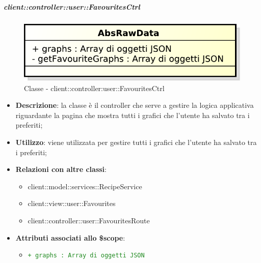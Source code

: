 		\subparagraph{client::controller::user::FavouritesCtrl} %
		\label{subp:client_controller_user_favouritesctrl}
			\begin{figure}[htbp]
				\centering
				\centerline{\includegraphics[scale=0.7]{./images/client/classes/controller/favourites_ctrl.pdf}}
				\caption{Classe - client::controller:user::FavouritesCtrl}
			\end{figure}
			\begin{itemize}
				\item \textbf{Descrizione}: la classe è il controller che serve a gestire la logica applicativa riguardante la pagina che mostra tutti i grafici che l'utente ha salvato tra i preferiti;
				\item \textbf{Utilizzo}: viene utilizzata per gestire tutti i grafici che l'utente ha salvato tra i preferiti;
				\item \textbf{Relazioni con altre classi}:
					\begin{itemize}
						\item client::model::services::RecipeService
						\item client::view::user::Favourites
						\item client::controller::user::FavouritesRoute
					\end{itemize}

				\item \textbf{Attributi associati allo \$scope}:
					\begin{itemize}
						\item \textcolor{forestgreen}{\texttt{+ graphs : Array di oggetti JSON}}


\end{itemize}
\end{itemize}
